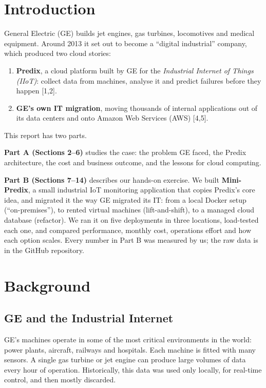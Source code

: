 \documentclass[12pt,a4paper]{article}
\begin{document}
\section{Introduction}
General Electric (GE) builds jet engines, gas turbines, locomotives and medical equipment. Around 2013
it set out to become a ``digital industrial'' company, which produced two cloud stories:
\begin{enumerate}
  \item \textbf{Predix}, a cloud platform built by GE for the \emph{Industrial Internet of Things (IIoT)}:
        collect data from machines, analyse it and predict failures before they happen [1,2].
  \item \textbf{GE's own IT migration}, moving thousands of internal applications out of its data
        centers and onto Amazon Web Services (AWS) [4,5].
\end{enumerate}

This report has two parts.

\textbf{Part A (Sections 2--6)} studies the case: the problem GE faced, the Predix architecture, the
cost and business outcome, and the lessons for cloud computing.

\textbf{Part B (Sections 7--14)} describes our hands-on exercise. We built \textbf{Mini-Predix}, a small
industrial IoT monitoring application that copies Predix's core idea, and migrated it the way GE
migrated its IT: from a local Docker setup (``on-premises''), to rented virtual machines
(lift-and-shift), to a managed cloud database (refactor). We ran it on five deployments in three
locations, load-tested each one, and compared performance, monthly cost, operations effort and how
each option scales. Every number in Part B was measured by us; the raw data is in the GitHub
repository.

\section{Background}
\subsection{GE and the Industrial Internet}
GE's machines operate in some of the most critical environments in the world: power plants, aircraft, railways and
hospitals. Each machine is fitted with many sensors. A single gas turbine or jet engine can produce large volumes of
data every hour of operation. Historically, this data was used only locally, for real-time control, and then mostly
discarded.
\end{document}
